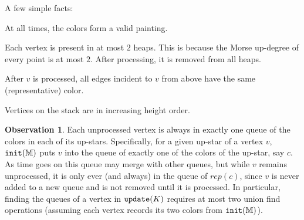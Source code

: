 \documentclass[11pt]{article}
\theoremstyle{definition}
\newtheorem{observation}[theorem]{Observation}
\newcommand{\MM}{\mathbb{M}}
\newcommand{\init}{{\tt init}}
\newcommand{\rep}{rep}
\newcommand{\stack}{K}
\newcommand{\update}{{\tt update}}
\begin{document}
A few simple facts:
\begin{compactitem}
	\item At all times, the colors form a valid painting.
	\item Each vertex is present in at most $2$ heaps. This is
    because the Morse up-degree of every point is at most $2$.
    After processing, it is removed from all heaps.
	\item After $v$ is processed, all edges incident to $v$ from above have the same (representative) color. %
	\item Vertices on the stack are in increasing height order. 
\end{compactitem}

\begin{observation}
\label{obs:twoQueues}
 Each unprocessed vertex is always in exactly one queue of the colors in each of its up-stars.  Specifically, 
 for a given up-star of a vertex $v$, $\init(\MM)$ puts $v$ into the queue of exactly one of the colors of the up-star, say $c$.  As time goes on this queue 
 may merge with other queues, but while $v$ remains unprocessed, it is only ever (and always) in the queue of $\rep(c)$,  
 since $v$ is never added to a new queue and is not removed until it is processed.  
 In particular, finding the queues of a vertex in $\update(K)$ requires at most two union find operations (assuming each vertex records its two colors from $\init(\MM)$).
\end{observation}
\end{document}
